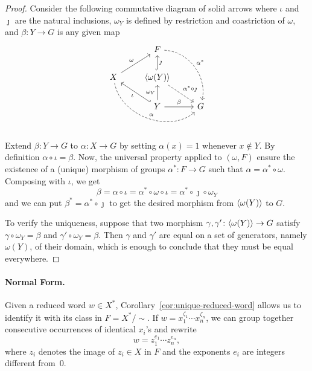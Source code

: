 \begin{proof}
    Consider the following commutative diagram of solid arrows where $\iota$ and $\jmath$ are the natural inclusions, $\omega_Y$ is defined by restriction and coastriction of $\omega$, and $\beta\colon Y\to G$ is any given map
    $$
        \begin{tikzcd}
                &F
                    \arrow[rdd,"\alpha^*",dashed,bend left=50]\\
            X
                    \arrow[ru,"\omega"]
                    \arrow[rrd,"\alpha",bend right=60,dashed]
                &\gen{\omega(Y)}
                    \arrow[u,"\jmath"',hook]
                    \arrow[rd,"\alpha^*\circ\jmath",dashed]\\
                &Y
                    \arrow[lu,"\iota",hook']
                    \arrow[u,"\omega_Y"]
                    \arrow[r,"\beta"]
                &G
        \end{tikzcd}
    $$
    Extend $\beta\colon Y\to G$ to $\alpha\colon X\to G$ by setting $\alpha(x)=1$ whenever $x\notin Y$. By definition $\alpha\circ\iota=\beta$. Now, the universal property applied to $(\omega, F)$ ensure the existence of a (unique) morphism of groups $\alpha^*\colon F\to G$ such that $\alpha=\alpha^*\circ\omega$. Composing with $\iota$, we get
    $$
        \beta = \alpha\circ\iota=\alpha^*\circ\omega\circ\iota
            = \alpha^*\circ\jmath\circ\omega_Y
    $$
    and we can put $\beta^*=\alpha^*\circ\jmath$ to get the desired morphism from $\langle\omega(Y)\rangle$ to $G$.

    To verify the uniqueness, suppose that two morphism $\gamma,\gamma'\colon\langle\omega(Y)\rangle\to G$ satisfy $\gamma\circ\omega_Y=\beta$ and $\gamma'\circ\omega_Y=\beta$. Then $\gamma$ and $\gamma'$ are equal on a set of generators, namely $\omega(Y)$, of their domain, which is enough to conclude that they must be equal everywhere.
\end{proof}

\paragraph{Normal Form.}
Given a reduced word $w\in X^*$, Corollary~\ref{cor:unique-reduced-word} allows us to identify it with its class in $F=X^*/{\sim}$. If $w=x_1^{\zeta_1}\cdots x_n^{\zeta_n}$, we can group together consecutive occurrences of identical $x_i$'s and rewrite
$$
    w=z_1^{e_1}\cdots z_n^{e_n},
$$
where $z_i$ denotes the image of $z_i\in X$ in $F$ and the exponents $e_i$ are integers different from~$0$.

